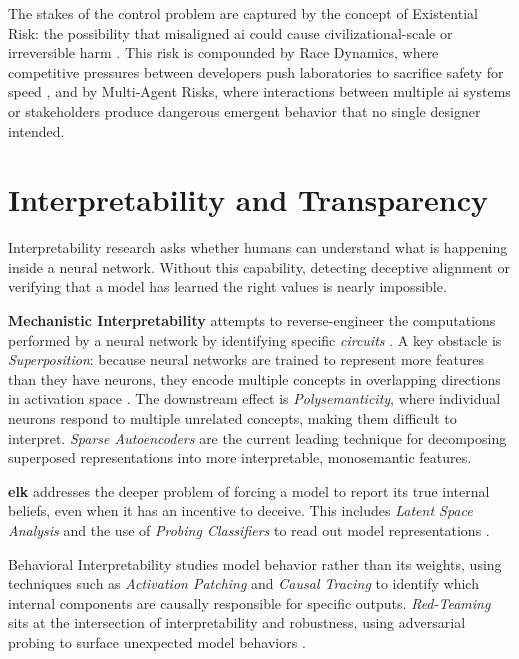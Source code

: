 \begin{toreview}
	The stakes of the control problem are captured by the concept of Existential Risk: the possibility that misaligned \gls{ai} could cause civilizational-scale or irreversible harm \cite{yampolskiy_controllability_2022}. This risk is compounded by Race Dynamics, where competitive pressures between developers push laboratories to sacrifice safety for speed \cite{hemphill_advanced_2025}, and by Multi-Agent Risks, where interactions between multiple \gls{ai} systems or stakeholders produce dangerous emergent behavior that no single designer intended.

	\section{Interpretability and Transparency}\label{sec:interpretability}

	Interpretability research asks whether humans can understand what is happening inside a neural network. Without this capability, detecting deceptive alignment or verifying that a model has learned the right values is nearly impossible.

	\textbf{Mechanistic Interpretability} attempts to reverse-engineer the computations performed by a neural network by identifying specific \textit{circuits} \cite{anthropic2025biology}. A key obstacle is \textit{Superposition}: because neural networks are trained to represent more features than they have neurons, they encode multiple concepts in overlapping directions in activation space \cite{anthropic2025biology}. The downstream effect is \textit{Polysemanticity}, where individual neurons respond to multiple unrelated concepts, making them difficult to interpret. \textit{Sparse Autoencoders} are the current leading technique for decomposing superposed representations into more interpretable, monosemantic features.

	\textbf{\gls{elk}} \cite{arc2025elk} addresses the deeper problem of forcing a model to report its true internal beliefs, even when it has an incentive to deceive. This includes \textit{Latent Space Analysis} and the use of \textit{Probing Classifiers} to read out model representations \cite{yu2025implicit}.

	Behavioral Interpretability studies model behavior rather than its weights, using techniques such as \textit{Activation Patching} and \textit{Causal Tracing} to identify which internal components are causally responsible for specific outputs. \textit{Red-Teaming} sits at the intersection of interpretability and robustness, using adversarial probing to surface unexpected model behaviors \cite{GapsSafetyEval2024}.


\end{toreview}
